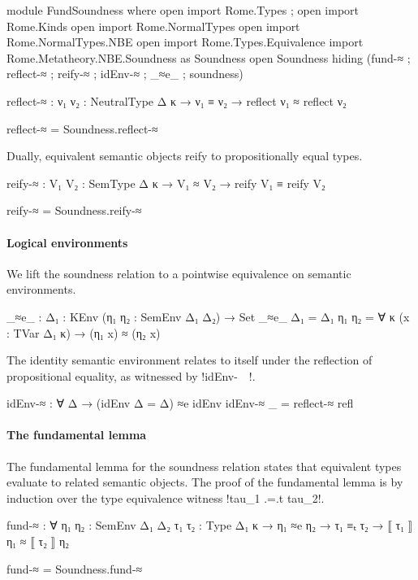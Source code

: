 \begin{AgdaAlign}
\begin{code}[hide] 
module FundSoundness where
  open import Rome.Types ; open import Rome.Kinds 
  open import Rome.NormalTypes
  open import Rome.NormalTypes.NBE
  open import Rome.Types.Equivalence
  import Rome.Metatheory.NBE.Soundness as Soundness
  open Soundness hiding (fund-≈ ; reflect-≈ ; reify-≈ ; idEnv-≈ ; _≈e_ ; soundness)
\end{code}
\begin{code}
  reflect-≈  : {ν₁ ν₂ : NeutralType Δ κ} →
               ν₁ ≡ ν₂ → reflect ν₁ ≈ reflect ν₂
\end{code}
\begin{code}[hide]
  reflect-≈ = Soundness.reflect-≈
\end{code}

\Ni Dually, equivalent semantic objects reify to propositionally equal types. 

\begin{code}
  reify-≈ : {V₁ V₂ : SemType Δ κ} → 
            V₁ ≈ V₂ → reify V₁ ≡ reify V₂ 
\end{code}
\begin{code}[hide]
  reify-≈ = Soundness.reify-≈
\end{code}

\paragraph{Logical environments}
We lift the soundness relation to a pointwise equivalence on semantic environments.

\begin{code}
  _≈e_ : {Δ₁ : KEnv} (η₁ η₂ : SemEnv Δ₁ Δ₂) → Set
  _≈e_ {Δ₁ = Δ₁} η₁ η₂ = 
    ∀ {κ} (x : TVar Δ₁ κ) → (η₁ x) ≈ (η₂ x)
\end{code}

\Ni  The identity semantic environment relates to itself under the reflection of propositional equality, as witnessed by !idEnv-~~!. 

\begin{code}
  idEnv-≈ : ∀ {Δ} → (idEnv {Δ = Δ}) ≈e idEnv
  idEnv-≈ _ = reflect-≈ refl
\end{code}

\paragraph{The fundamental lemma}

The fundamental lemma for the soundness relation states that equivalent types evaluate to related semantic objects. The proof of the fundamental lemma is by induction over the type equivalence witness !tau_1 .=.t tau_2!.
\begin{code}
  fund-≈ : ∀ {η₁ η₂ : SemEnv Δ₁ Δ₂}
           {τ₁ τ₂ : Type Δ₁ κ} → 
           η₁ ≈e η₂ → 
           τ₁ ≡ₜ τ₂ → 
          ⟦ τ₁ ⟧ η₁ ≈ ⟦ τ₂ ⟧ η₂
\end{code}
\begin{code}[hide]
  fund-≈ = Soundness.fund-≈
\end{code}


\end{AgdaAlign}
